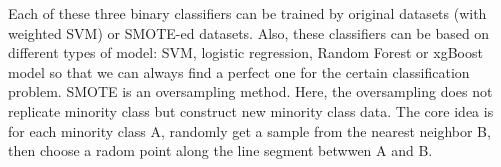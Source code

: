 Each of these three binary classifiers can be trained by original datasets (with weighted SVM) or
SMOTE-ed datasets. Also, these classifiers can be based on different types of model: SVM, logistic regression, Random Forest or xgBoost model so that we can always find a perfect one for the certain classification problem.
SMOTE is an oversampling method.
Here, the oversampling does not replicate minority class but 
construct new minority class data. The core idea is for each 
minority class A, randomly get a sample from the nearest neighbor B, 
then choose a radom point
along the line segment betwwen A and B.

